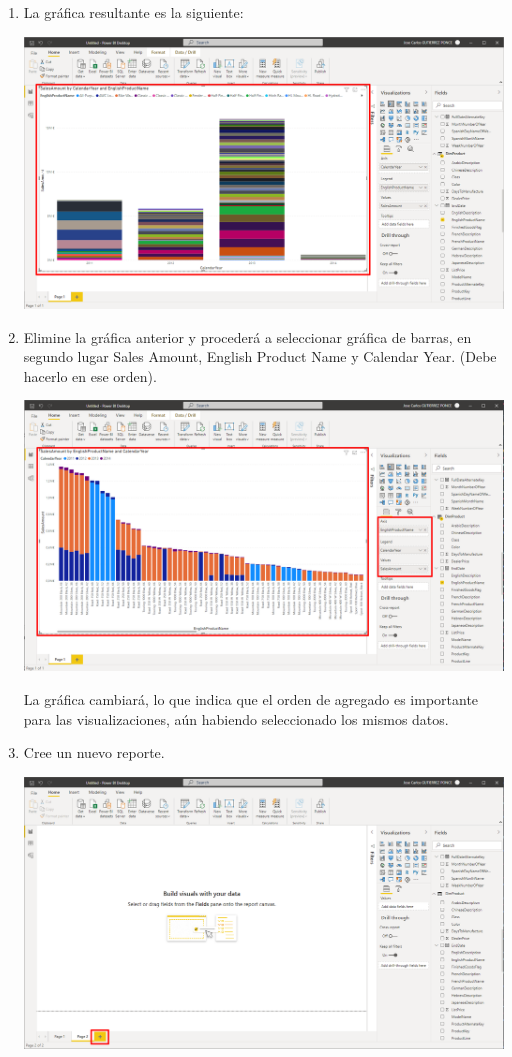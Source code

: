 \documentclass[12pt,letterpaper]{article}
\newcommand\tab[1][1cm]{\hspace*{#1}}
\begin{document}
\begin{enumerate}[\tab 1.]
\begin{center}
        \end{center}
        \item La gráfica resultante es la siguiente:
        \begin{center}
            \includegraphics[width=13cm]{./img/img6.png}
        \end{center}
        \item Elimine la gráfica anterior y procederá a seleccionar gráfica de barras, en segundo lugar Sales Amount, English Product Name y Calendar Year. (Debe hacerlo en ese orden).
        \begin{center}
            \includegraphics[width=13cm]{./img/img7.png}
        \end{center}
        La gráfica cambiará, lo que indica que el orden de agregado es importante para las visualizaciones, aún habiendo seleccionado los mismos datos.          
        \item Cree un nuevo reporte.
        \begin{center}
            \includegraphics[width=13cm]{./img/img8.png}

\end{center}
\end{enumerate}
\end{document}
